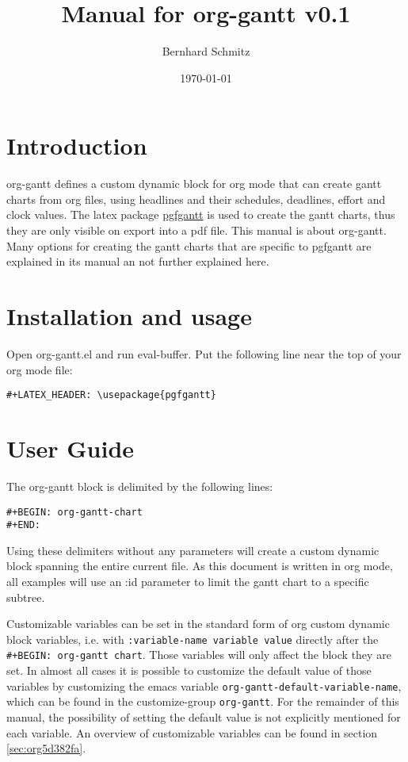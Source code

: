 \documentclass[11pt]{article}
\author{Bernhard Schmitz}
\date{\today}
\title{Manual for org-gantt \linebreak v0.1}
\begin{document}
\maketitle
\tableofcontents


\section{Introduction}
\label{sec:orgaf758d8}
org-gantt defines a custom dynamic block for org mode that can create gantt charts from org files, using headlines and their schedules, deadlines, effort and clock values.
The latex package \href{https://www.ctan.org/pkg/pgfgantt}{pgfgantt} is used to create the gantt charts, thus they are only visible on export into a pdf file. This manual is about org-gantt. Many options for creating the gantt charts that are specific to pgfgantt are explained in its manual an not further explained here.

\section{Installation and usage}
\label{sec:org592c026}
Open org-gantt.el and run eval-buffer.
Put the following line near the top of your org mode file:
\begin{verbatim}
#+LATEX_HEADER: \usepackage{pgfgantt}
\end{verbatim}

\section{User Guide}
\label{sec:orga49050f}
The org-gantt block is delimited by the following lines:
\begin{verbatim}
#+BEGIN: org-gantt-chart
#+END:
\end{verbatim}
Using these delimiters without any parameters will create a custom dynamic block spanning the entire current file. As this document is written in org mode, all examples will use an :id parameter to limit the gantt chart to a specific subtree.

Customizable variables can be set in the standard form of org custom dynamic block variables, i.e. with \texttt{:variable-name variable value} directly after the \texttt{\#+BEGIN: org-gantt chart}. Those variables will only affect the block they are set. In almost all cases it is possible to customize the default value of those variables by customizing the emacs variable \texttt{org-gantt-default-variable-name}, which can be found in the customize-group \texttt{org-gantt}. For the remainder of this manual, the possibility of setting the default value is not explicitly mentioned for each variable. An overview of customizable variables can be found in section \ref{sec:org5d382fa}.
\end{document}
